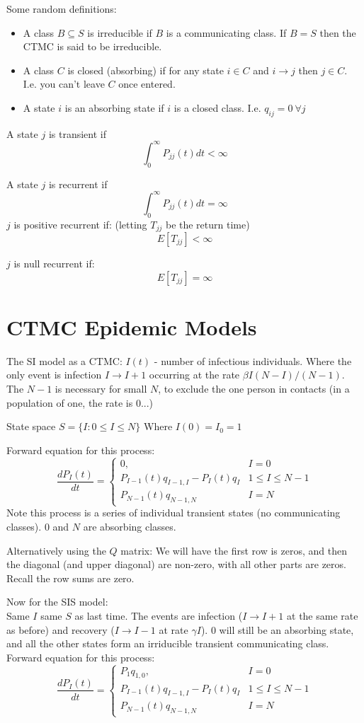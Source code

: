 \documentclass{/home/janmebows/Documents/LatexTemplates/myassignment}
\begin{document}
Some random definitions:
\begin{itemize}
    \item A class $B \subseteq S$ is irreducible if $B$ is a communicating class. If $B = S$ then the CTMC is said to be irreducible.
    \item A class $C$ is closed (absorbing) if for any state $i\in C$ and $i \to j$ then $j \in C$. I.e. you can't leave $C$ once entered.
    \item A state $i$ is an absorbing state if $i$ is a closed class. I.e. $q_{ij} = 0 \ \forall j$
\end{itemize}

A state $j$ is transient if
\[\int_0^\infty P_{jj}(t) dt < \infty\]


A state $j$ is recurrent if
\[\int_0^\infty P_{jj}(t) dt = \infty\]
$j$ is positive recurrent if: (letting $T_{jj}$ be the return time)
\[E[T_{jj}] < \infty \]

$j$ is null recurrent if:
\[E[T_{jj}] = \infty\]


\section{CTMC Epidemic Models}
The SI model as a CTMC:
$I(t)$ - number of infectious individuals. Where the only event is infection $I\to I+1$ occurring at the rate $\beta I(N-I)/(N-1)$. The $N-1$ is necessary for small $N$, to exclude the one person in contacts (in a population of one, the rate is 0...)

State space $S = \{I : 0\leq I \leq N\}$ Where $I(0) = I_0 = 1$

Forward equation for this process:
\[\frac{dP_I(t)}{dt} = \begin{cases}
0,& I=0\\
P_{I-1}(t)q_{I-1,I} - P_{I}(t) q_{I}& 1\leq I \leq N-1\\
P_{N-1}(t) q_{N-1,N}& I=N
\end{cases}\]
Note this process is a series of individual transient states (no communicating classes). $0$ and $N$ are absorbing classes.

Alternatively using the $Q$ matrix:
We will have the first row is zeros, and then the diagonal (and upper diagonal) are non-zero, with all other parts are zeros.
Recall the row sums are zero.

Now for the SIS model:\\
Same $I$ same $S$ as last time. The events are infection ($I\to I+1$ at the same rate as before) and recovery ($I\to I-1$ at rate $\gamma I$). $0$ will still be an absorbing state, and all the other states form an irriducible transient communicating class.
Forward equation for this process:
\[\frac{dP_I(t)}{dt} = \begin{cases}
P_{1} q_{1,0},& I=0\\
P_{I-1}(t)q_{I-1,I} - P_{I}(t) q_{I}& 1\leq I \leq N-1\\
P_{N-1}(t) q_{N-1,N}& I=N
\end{cases}\]
\end{document}
